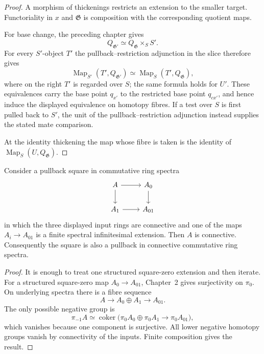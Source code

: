\begin{proof}
A morphism of thickenings restricts an extension to the smaller target.
Functoriality in $x$ and $\mathfrak G$ is composition with the corresponding
quotient maps.

For base change, the preceding chapter gives
\[
    Q_{\mathfrak G'}
    \simeq
    Q_{\mathfrak G}\times_SS'.
\]
For every $S'$-object $T'$ the pullback--restriction adjunction in the slice
therefore gives
\[
    \operatorname{Map}_{S'}(T',Q_{\mathfrak G'})
    \simeq
    \operatorname{Map}_{S}(T',Q_{\mathfrak G}),
\]
where on the right $T'$ is regarded over $S$; the same formula holds for
$U'$.  These equivalences carry the base point $q_{x'}$ to the restricted
base point $q_{cx'}$, and hence induce the displayed equivalence on homotopy
fibres.  If a test over $S$ is first pulled back to $S'$, the unit of the
pullback--restriction adjunction instead supplies the stated mate comparison.

At the identity thickening the map whose fibre is taken is the identity of
$\operatorname{Map}_S(U,Q_{\mathfrak G})$.
\end{proof}

\begin{lemma}
\label{lem:bnla-connective-pullback-infinitesimal}
Consider a pullback square in commutative ring spectra
\[
\begin{tikzcd}
A \arrow[r] \arrow[d] & A_0 \arrow[d]\\
A_1 \arrow[r] & A_{01}
\end{tikzcd}
\]
in which the three displayed input rings are connective and one of the maps
$A_i\to A_{01}$ is a finite spectral infinitesimal extension.  Then $A$ is
connective.  Consequently the square is also a pullback in connective
commutative ring spectra.
\end{lemma}

\begin{proof}
It is enough to treat one structured square-zero extension and then iterate.
For a structured square-zero map $A_0\to A_{01}$, Chapter~2 gives
surjectivity on $\pi_0$.  On underlying spectra there is a fibre sequence
\[
    A\longrightarrow A_0\oplus A_1\longrightarrow A_{01}.
\]
The only possible negative group is
\[
    \pi_{-1}A
    \simeq
    \operatorname{coker}
    \bigl(\pi_0A_0\oplus\pi_0A_1\to\pi_0A_{01}\bigr),
\]
which vanishes because one component is surjective.  All lower negative
homotopy groups vanish by connectivity of the inputs.  Finite composition
gives the result.
\end{proof}

